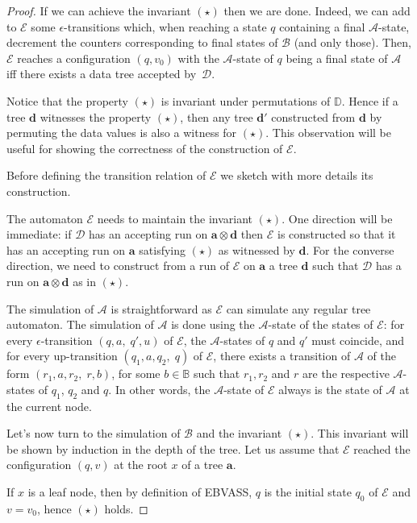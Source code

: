 \documentclass{CSML}
\newcommand\ebvass{\textup{EBVASS}\xspace}
\newcommand\B{\mathbb{B}}
\newcommand\D{\mathbb{D}}
\newcommand\Aa{\mathcal{A}}
\newcommand\Ba{\mathcal{B}}
\newcommand\Da{\mathcal{D}}
\newcommand\Ea{\mathcal{E}}
\newcommand\atree{\boldsymbol{a}}
\newcommand\dtree{\boldsymbol{d}}
\begin{document}
\begin{proof}
If we can achieve the invariant $(\star)$ then we are done.
Indeed, we can add to $\Ea$ some $\epsilon$-transitions which, 
when reaching a state $q$ containing a final $\Aa$-state,
decrement the counters corresponding to final states of $\Ba$ (and only those).
Then, $\Ea$ reaches a configuration $(q,v_0)$ with the $\Aa$-state of $q$ being
a final state of $\Aa$ iff there exists a data tree accepted by~$\Da$.


Notice that the property $(\star)$ is invariant under permutations of $\D$.
Hence if a tree $\dtree$ witnesses the property $(\star)$, then any tree
$\dtree'$ constructed from $\dtree$ by permuting the data values is also a
witness for $(\star)$.  This observation will be useful for showing the
correctness of the construction of $\Ea$.

 
Before defining the transition relation of $\Ea$ we sketch with more details its
construction.

The automaton $\Ea$ needs to maintain the invariant $(\star)$.  One direction
will be immediate: if $\Da$ has an accepting run on $\atree\otimes\dtree$ then
$\Ea$ is constructed so that it has an accepting run on $\atree$ satisfying
$(\star)$ as witnessed by $\dtree$. For the converse direction, we need to
construct from a run of $\Ea$ on $\atree$ a tree $\dtree$ such that
$\Da$ has a run on $\atree \otimes \dtree$ as in $(\star)$.

The simulation of $\Aa$ is straightforward as $\Ea$ can simulate any regular
tree automaton. The simulation of $\Aa$ is done using the $\Aa$-state of the
states of $\Ea$: for every $\epsilon$-transition $(q,a,\; q',u)$ of $\Ea$, the
$\Aa$-states of $q$ and $q'$ must coincide, and for every up-transition
$(q_1, a, q_2,\; q)$ of $\Ea$, there exists a transition of $\Aa$ of the form
$(r_1, a, r_2,\; r, b)$, for some $b \in \B$ such that $r_1,r_2$ and $r$ are
the respective $\Aa$-states of $q_1$, $q_2$ and $q$. In other words, the
$\Aa$-state of $\Ea$ always is the state of $\Aa$ at the current node.

Let's now turn to the simulation of $\Ba$ and the invariant $(\star)$.
This invariant will be shown by induction in the depth of the tree.
Let us assume that $\Ea$ reached the configuration $(q,v)$ 
at the root $x$ of a tree $\atree$.

If $x$ is a leaf node, then by definition of \ebvass, 
$q$ is the initial state $q_0$ of $\Ea$ 
and $v = v_0$,
hence $(\star)$ holds.


\end{proof}
\end{document}
